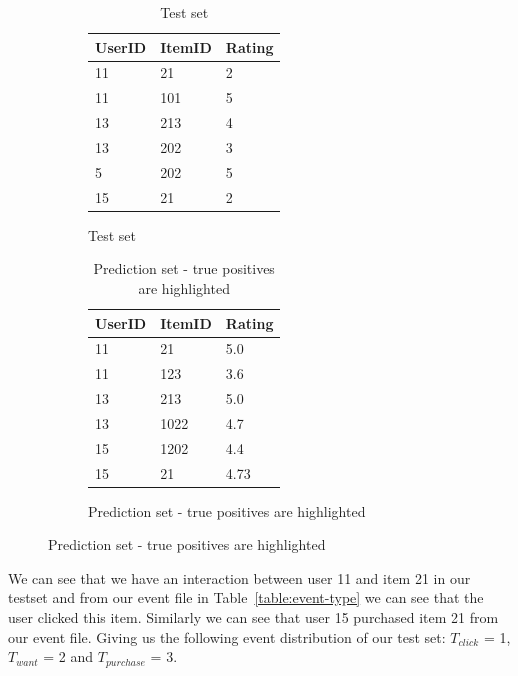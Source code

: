 \begin{figure}[H]
		\begin{subfigure}{.5\textwidth}
        \begin{table}[H]
        \centering
        	\begin{tabular}{*{3}l}
        	\toprule
        			UserID	&	ItemID	 &  Rating  	\\ \midrule
        			11		&	21		 &	2			\\
        			11		&	101		 &	5			\\
        			13		&	213		 &	4			\\
        			13		&	202		 &  3			\\
        			5		&	202		 &  5			\\
        			15		&	21		 &  2			\\
        	\bottomrule
        	\end{tabular}
        	\caption{Test set}
        \end{table}
        \end{subfigure}
        \begin{subfigure}{.5\textwidth}
            \begin{table}[H]
            \centering
            	\begin{tabular}{*{3}l}
            	\toprule
            		UserID	&	ItemID	 &  Rating  	\\ \midrule
            		\rowcolor{Gray}
            		11		&	21		 &	5.0			\\
            		11		&	123		 &	3.6			\\
            		\rowcolor{Gray}
            		13		&	213		 &	5.0			\\
            		13		&	1022	 &  4.7			\\
            		15		&	1202	 &  4.4			\\
            		\rowcolor{Gray}
            		15		&	21		 &  4.73		\\
            	\bottomrule
            	\end{tabular}
            	\caption{Prediction set - true positives are highlighted}
            \end{table}
          \end{subfigure}
\end{figure}

We can see that we have an interaction between user 11 and item 21 in our testset and from our event file in
Table~\ref{table:event-type} we can see that the user clicked this item. Similarly we can see that user 15 purchased
item 21 from our event file. Giving us the following event distribution of our test set: $T_{click}$ = 1, $T_{want}$ = 2 and
$T_{purchase}$ = 3.

